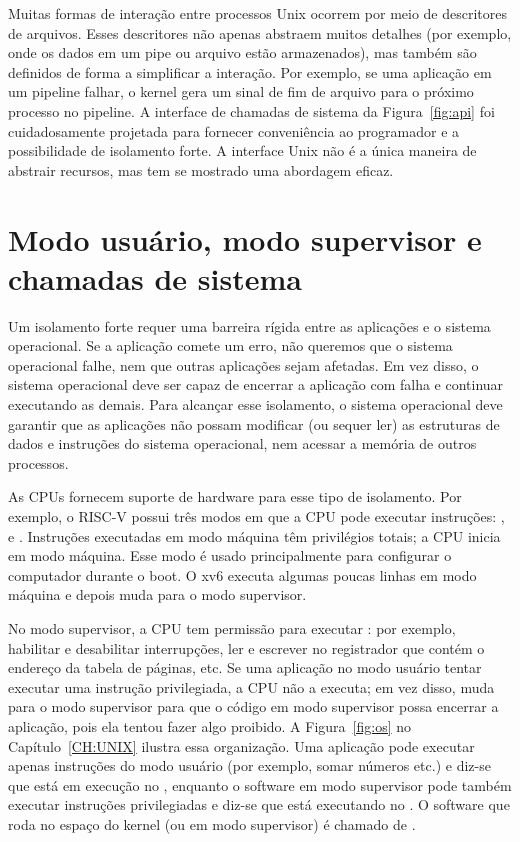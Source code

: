 Muitas formas de interação entre processos Unix ocorrem por meio de descritores de arquivos. Esses descritores não apenas abstraem muitos detalhes (por exemplo, onde os dados em um pipe ou arquivo estão armazenados), mas também são definidos de forma a simplificar a interação. Por exemplo, se uma aplicação em um pipeline falhar, o kernel gera um sinal de fim de arquivo para o próximo processo no pipeline.
A interface de chamadas de sistema da Figura~\ref{fig:api} foi cuidadosamente projetada para fornecer conveniência ao programador e a possibilidade de isolamento forte. A interface Unix não é a única maneira de abstrair recursos, mas tem se mostrado uma abordagem eficaz.

\section{Modo usuário, modo supervisor e chamadas de sistema}

Um isolamento forte requer uma barreira rígida entre as aplicações e o sistema
operacional. Se a aplicação comete um erro, não queremos que o sistema
operacional falhe, nem que outras aplicações sejam afetadas. Em vez disso, o sistema
operacional deve ser capaz de encerrar a aplicação com falha e continuar executando
as demais. Para alcançar esse isolamento, o sistema operacional deve garantir que
as aplicações não possam modificar (ou sequer ler) as estruturas de dados e
instruções do sistema operacional, nem acessar a memória de outros processos.

As CPUs fornecem suporte de hardware para esse tipo de isolamento. Por exemplo,
o RISC-V possui três modos em que a CPU pode executar instruções:
,
 e
.
Instruções executadas em modo máquina têm privilégios totais; a
CPU inicia em modo máquina. Esse modo é usado principalmente para
configurar o computador durante o boot. O xv6 executa algumas poucas linhas em
modo máquina e depois muda para o modo supervisor.

No modo supervisor, a CPU tem permissão para executar 
:
por exemplo, habilitar e desabilitar interrupções, ler e escrever
no registrador que contém o endereço da tabela de páginas, etc.
Se uma aplicação no modo usuário tentar executar
uma instrução privilegiada, a CPU não a executa; em vez disso, muda
para o modo supervisor para que o código em modo supervisor possa encerrar a aplicação,
pois ela tentou fazer algo proibido.
A Figura~\ref{fig:os}
no Capítulo~\ref{CH:UNIX} ilustra essa organização. Uma aplicação pode
executar apenas instruções do modo usuário (por exemplo, somar números etc.) e diz-se que
está em execução no 
,
enquanto o software em modo supervisor pode também executar instruções privilegiadas e
diz-se que está executando no
.
O software que roda no espaço do kernel (ou em modo supervisor) é chamado de
.

